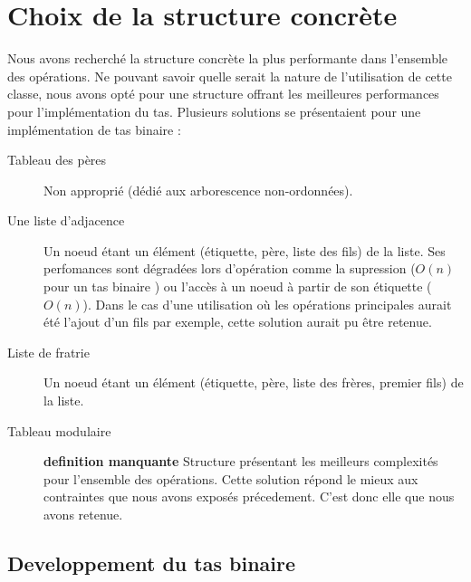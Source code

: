 \chapter[Concrète]{Choix de la structure concrète%
}



Nous avons recherché la structure concrète la plus performante dans l'ensemble des opérations. Ne pouvant savoir quelle serait la nature de l'utilisation de cette classe, nous avons opté pour une structure offrant les meilleures performances pour l'implémentation du tas.
Plusieurs solutions se présentaient pour une implémentation de tas binaire :
\begin{description}
\item
[Tableau des pères] Non approprié (dédié aux arborescence non-ordonnées).
\item[Une liste d'adjacence] Un noeud étant un élément  (étiquette, père, liste des fils) de la liste. Ses perfomances sont dégradées lors d'opération comme la supression ($O(n)$ pour un tas binaire ) ou l'accès à un noeud à partir de son étiquette ($O(n)$). Dans le cas d'une utilisation où les opérations principales aurait été l'ajout d'un fils par exemple, cette solution aurait pu être retenue.
\item[Liste de fratrie]  Un noeud étant un élément (étiquette, père, liste des frères, premier fils)  de la liste.
\item[Tableau modulaire]
\textbf{definition manquante} Structure présentant les meilleurs complexités pour l'ensemble des opérations. Cette solution répond le mieux aux contraintes que nous avons exposés précedement. C'est donc elle que nous avons retenue. 
\end{description} 


\section[Developpement]{Developpement du tas binaire%
}

